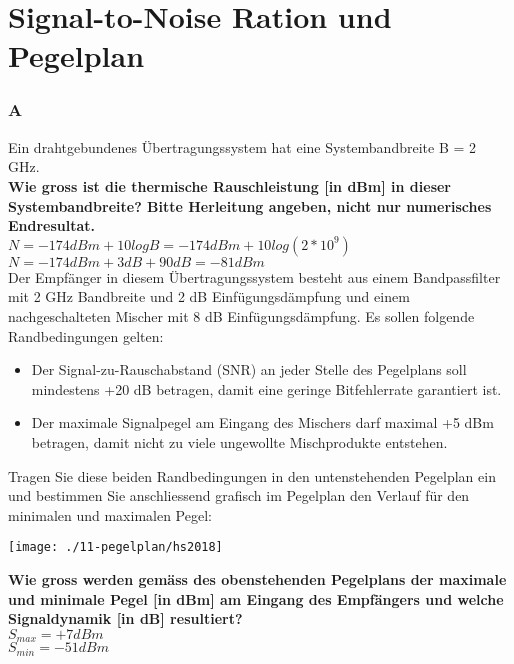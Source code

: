 

\section{Signal-to-Noise Ration und Pegelplan}

\subsubsection{A}
Ein drahtgebundenes Übertragungssystem hat eine Systembandbreite B = 2 GHz.\\

\textbf{Wie gross ist die thermische Rauschleistung [in dBm] in dieser Systembandbreite? Bitte Herleitung angeben, nicht nur numerisches Endresultat.}\\
$N=-174dBm+10logB=-174dBm+10log(2*10^9)$\\
$N=-174dBm + 3 dB + 90 dB = -81dBm$\\

Der Empfänger in diesem Übertragungssystem besteht aus einem Bandpassfilter mit 2 GHz Bandbreite und 2 dB Einfügungsdämpfung und einem nachgeschalteten Mischer
mit 8 dB Einfügungsdämpfung. Es sollen folgende Randbedingungen gelten:\\
\begin{itemize}
    \item Der Signal-zu-Rauschabstand (SNR) an jeder Stelle des Pegelplans soll mindestens +20 dB betragen, damit eine geringe Bitfehlerrate garantiert ist.
    \item Der maximale Signalpegel am Eingang des Mischers darf maximal +5 dBm betragen, damit nicht zu viele ungewollte Mischprodukte entstehen.\\
\end{itemize}

Tragen Sie diese beiden Randbedingungen in den untenstehenden Pegelplan ein und bestimmen Sie anschliessend grafisch im Pegelplan den Verlauf für den minimalen und
maximalen Pegel:
\begin{center}
    \vspace{-8pt}
    \texttt{[image: ./11-pegelplan/hs2018]}
    \vspace{-8pt}
\end{center}

\textbf{Wie gross werden gemäss des obenstehenden Pegelplans der maximale und minimale Pegel [in dBm] am Eingang des Empfängers und welche Signaldynamik [in dB] resultiert?}\\
$S_{max}=+7dBm$\\
$S_{min}=-51dBm$\\

